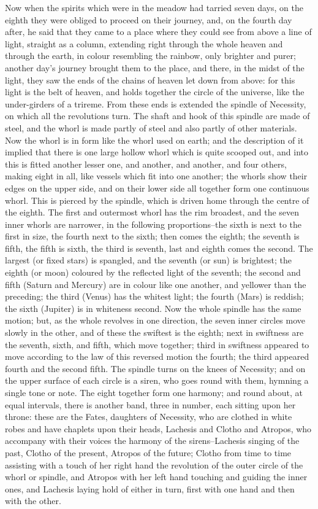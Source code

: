Now when the spirits which were in the meadow had tarried seven days,
on the eighth they were obliged to proceed on their journey, and, on the
fourth day after, he said that they came to a place where they could
see from above a line of light, straight as a column, extending right
through the whole heaven and through the earth, in colour resembling the
rainbow, only brighter and purer; another day's journey brought them to
the place, and there, in the midst of the light, they saw the ends of
the chains of heaven let down from above: for this light is the belt
of heaven, and holds together the circle of the universe, like the
under-girders of a trireme. From these ends is extended the spindle of
Necessity, on which all the revolutions turn. The shaft and hook of this
spindle are made of steel, and the whorl is made partly of steel and
also partly of other materials. Now the whorl is in form like the whorl
used on earth; and the description of it implied that there is one large
hollow whorl which is quite scooped out, and into this is fitted another
lesser one, and another, and another, and four others, making eight
in all, like vessels which fit into one another; the whorls show their
edges on the upper side, and on their lower side all together form one
continuous whorl. This is pierced by the spindle, which is driven home
through the centre of the eighth. The first and outermost whorl has the
rim broadest, and the seven inner whorls are narrower, in the following
proportions--the sixth is next to the first in size, the fourth next
to the sixth; then comes the eighth; the seventh is fifth, the fifth
is sixth, the third is seventh, last and eighth comes the second.
The largest (or fixed stars) is spangled, and the seventh (or sun) is
brightest; the eighth (or moon) coloured by the reflected light of the
seventh; the second and fifth (Saturn and Mercury) are in colour like
one another, and yellower than the preceding; the third (Venus) has the
whitest light; the fourth (Mars) is reddish; the sixth (Jupiter) is in
whiteness second. Now the whole spindle has the same motion; but, as the
whole revolves in one direction, the seven inner circles move slowly in
the other, and of these the swiftest is the eighth; next in swiftness
are the seventh, sixth, and fifth, which move together; third in
swiftness appeared to move according to the law of this reversed motion
the fourth; the third appeared fourth and the second fifth. The spindle
turns on the knees of Necessity; and on the upper surface of each circle
is a siren, who goes round with them, hymning a single tone or note. The
eight together form one harmony; and round about, at equal intervals,
there is another band, three in number, each sitting upon her throne:
these are the Fates, daughters of Necessity, who are clothed in white
robes and have chaplets upon their heads, Lachesis and Clotho
and Atropos, who accompany with their voices the harmony of the
sirens--Lachesis singing of the past, Clotho of the present, Atropos of
the future; Clotho from time to time assisting with a touch of her right
hand the revolution of the outer circle of the whorl or spindle, and
Atropos with her left hand touching and guiding the inner ones, and
Lachesis laying hold of either in turn, first with one hand and then
with the other.

